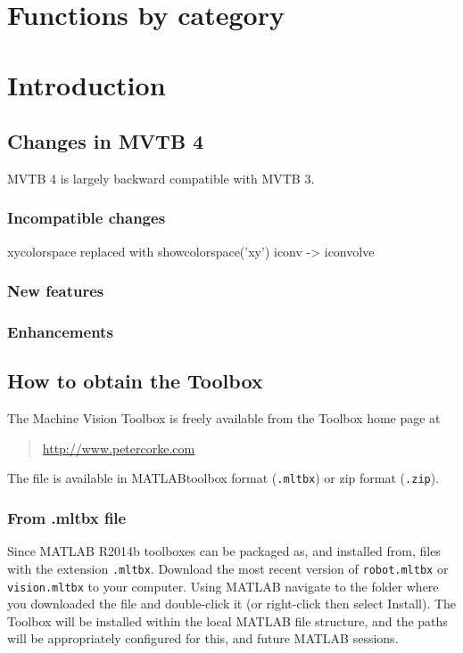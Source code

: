 \documentclass[a4paper,twoside]{report}
\def\Mlab{MATLAB}
\begin{document}
\newpage
\tableofcontents
\newpage
\chapter*{Functions by category}
\begin{multicols}{2}

\end{multicols}
\newpage
\chapter{Introduction}
\section{Changes in MVTB 4}
MVTB 4 is largely backward compatible with MVTB 3.

\subsection{Incompatible changes}

xycolorspace replaced with showcolorspace('xy')
iconv -> iconvolve

\subsection{New features}

\subsection{Enhancements}

\section{How to obtain the Toolbox}
The Machine Vision Toolbox is freely available from the Toolbox home
page at 
\begin{quote}
\url{http://www.petercorke.com}
\end{quote}


The file is available in \Mlab toolbox format (\texttt{.mltbx}) or zip format (\texttt{.zip}). 

\subsection{From .mltbx file}
Since MATLAB R2014b toolboxes can be packaged as, and installed from, files with the extension \texttt{.mltbx}. Download the most recent version of \texttt{robot.mltbx} or \texttt{vision.mltbx} to your computer. Using MATLAB navigate to the folder where you downloaded the file and double-click it (or right-click then select Install). The Toolbox will be installed within the local MATLAB file structure, and the paths will be appropriately configured for this, and future MATLAB sessions.
\end{document}
